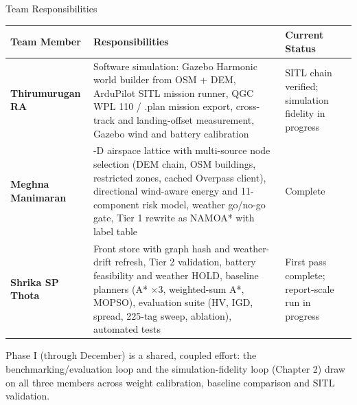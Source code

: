 \documentclass[aspectratio=169,11pt]{beamer}
\begin{document}
\begin{frame}{Team Responsibilities}
  \scriptsize
  \begin{tabularx}{\textwidth}{>{\bfseries}p{2.6cm}>{\raggedright\arraybackslash}X >{\raggedright\arraybackslash}p{2.8cm}}
    \toprule
    Team Member & Responsibilities & Current Status \\
    \midrule
    Thirumurugan RA & Software simulation: Gazebo Harmonic world builder from OSM + DEM, ArduPilot SITL mission runner, QGC WPL 110 / .plan mission export, cross-track and landing-offset measurement, Gazebo wind and battery calibration & SITL chain verified; simulation fidelity in progress \\
    \addlinespace
    Meghna Manimaran & 3-D airspace lattice with multi-source node selection (DEM chain, OSM buildings, restricted zones, cached Overpass client), directional wind-aware energy and 11-component risk model, weather go/no-go gate, Tier 1 rewrite as NAMOA* with label table & Complete \\
    \addlinespace
    Shrika SP Thota & Front store with graph hash and weather-drift refresh, Tier 2 validation, battery feasibility and weather HOLD, baseline planners (A* $\times$3, weighted-sum A*, MOPSO), evaluation suite (HV, IGD, spread, 225-tag sweep, ablation), automated tests & First pass complete; report-scale run in progress \\
    \bottomrule
  \end{tabularx}
  \vspace{3mm}

  \scriptsize
  Phase I (through December) is a shared, coupled effort: the benchmarking/evaluation loop and the simulation-fidelity loop (Chapter 2) draw on all three members across weight calibration, baseline comparison and SITL validation.
\end{frame}
\end{document}
